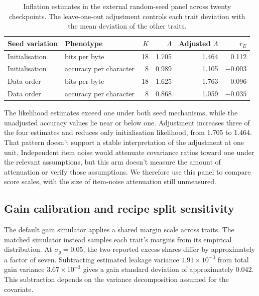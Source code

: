 \begin{table}[!htb]
\centering
\caption{Inflation estimates in the external random-seed panel across twenty checkpoints. The leave-one-out adjustment controls each trait deviation with the mean deviation of the other traits.}
\label{tab:original12}
\small\setlength{\tabcolsep}{4pt}\renewcommand{\arraystretch}{1.12}
\begin{tabular}{llrrrr}\toprule
Seed variation & Phenotype & $K$ & $\Lambda$ & Adjusted $\Lambda$ & $\bar r_E$\\\midrule
Initialisation & bits per byte & 18 & 1.705 & 1.464 & 0.112\\
Initialisation & accuracy per character & 8 & 0.989 & 1.105 & $-0.003$\\
Data order & bits per byte & 18 & 1.625 & 1.763 & 0.096\\
Data order & accuracy per character & 8 & 0.868 & 1.059 & $-0.035$\\\bottomrule
\end{tabular}
\end{table}

The likelihood estimates exceed one under both seed mechanisms, while the unadjusted accuracy values lie near or below one. Adjustment increases three of the four estimates and reduces only initialisation likelihood, from 1.705 to 1.464. That pattern doesn't support a stable interpretation of the adjustment at one unit. Independent item noise would attenuate covariance ratios toward one under the relevant assumptions, but this arm doesn't measure the amount of attenuation or verify those assumptions. We therefore use this panel to compare score scales, with the size of item-noise attenuation still unmeasured.

\subsection{Gain calibration and recipe split sensitivity}
The default gain simulator applies a shared margin scale across traits. The matched simulator instead samples each trait's margins from its empirical distribution. At $\sigma_g=0.05$, the two reported excess shares differ by approximately a factor of seven. Subtracting estimated leakage variance $1.91\times10^{-3}$ from total gain variance $3.67\times10^{-3}$ gives a gain standard deviation of approximately 0.042. This subtraction depends on the variance decomposition assumed for the covariate.

